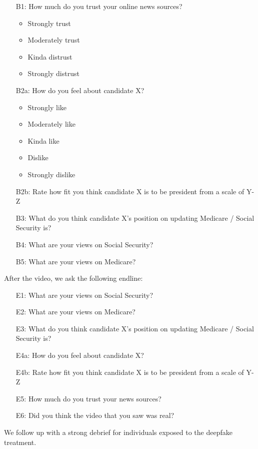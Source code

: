 {  
\begin{itemize}
\item[B1:] How much do you trust your online news sources?
  \begin{itemize}
    \item Strongly trust
    \item Moderately trust
    \item Kinda distrust
    \item Strongly distrust
  \end{itemize}
\item[B2a:] How do you feel about candidate X?
  \begin{itemize}
  \item Strongly like 
  \item Moderately like
  \item Kinda like
  \item Dislike
  \item Strongly dislike
  \end{itemize}
\item[B2b:] Rate how fit you think candidate X is to be president from a scale of Y-Z
\item[B3:] What do you think candidate X's position on updating Medicare / Social Security is?
\item[B4:] What are your views on Social Security?
\item[B5:] What are your views on Medicare?
\end{itemize}
}

After the video, we ask the following endline:

{  
\begin{itemize}
\item[E1:] What are your views on Social Security?
\item[E2:] What are your views on Medicare?
\item[E3:] What do you think candidate X's position on updating Medicare / Social Security is?
\item[E4a:] How do you feel about candidate X?
\item[E4b:] Rate how fit you think candidate X is to be president from a scale of Y-Z
\item[E5:] How much do you trust your news sources?
\item[E6:] Did you think the video that you saw was real?
\end{itemize}
}

We follow up with a strong debrief for individuals exposed to the deepfake treatment. 

